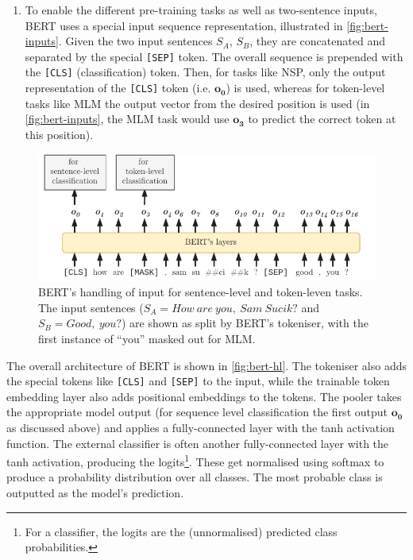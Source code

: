 \documentclass[bsc,frontabs,twoside,singlespacing,parskip,deptreport]{infthesis}
\begin{document}
{{{\begin{enumerate}
        \item To enable the different pre-training tasks as well as two-sentence inputs, BERT uses a special input sequence representation, illustrated in \autoref{fig:bert-inputs}. Given the two input sentences $S_A$, $S_B$, they are concatenated and separated by the special \verb|[SEP]| token. The overall sequence is prepended with the \verb|[CLS]| (classification) token. Then, for tasks like NSP, only the output representation of the \verb|[CLS]| token (i.e. $\bm{o_0}$) is used, whereas for token-level tasks like MLM the output vector from the desired position is used (in \autoref{fig:bert-inputs}, the MLM task would use $\bm{o_3}$ to predict the correct token at this position).
      \end{enumerate}

      \begin{figure}[h!t]
        \centering
        \includegraphics[width=14cm]{graphics/bert-inputs}
        \caption{BERT's handling of input for sentence-level and token-leven tasks. The input sentences ($S_A = How\ are\ you,\ Sam\ Sucik?$ and $S_B = Good,\ you?$) are shown as split by BERT's tokeniser, with the first instance of ``you'' masked out for MLM.}
        \label{fig:bert-inputs}
      \end{figure}
      The overall architecture of BERT is shown in \autoref{fig:bert-hl}. The tokeniser also adds the special tokens like \verb|[CLS]| and \verb|[SEP]| to the input, while the trainable token embedding layer also adds positional embeddings to the tokens. The pooler takes the appropriate model output (for sequence level classification the first output $\bm{o_0}$ as discussed above) and applies a fully-connected layer with the tanh activation function.
      The external classifier is often another fully-connected layer with the tanh activation, producing the logits\footnote{For a classifier, the logits are the (unnormalised) predicted class probabilities.}. These get normalised using softmax to produce a probability distribution over all classes. The most probable class is outputted as the model's prediction.
      
}}}
\end{document}
